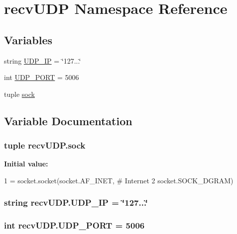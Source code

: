 \hypertarget{namespacerecvUDP}{}\section{recv\+U\+D\+P Namespace Reference}
\label{namespacerecvUDP}
\subsection*{Variables}
\begin{DoxyCompactItemize}
\item 
string \hyperlink{namespacerecvUDP_a8caab7f3ca6ec1e8af1bb857f11aeb48}{U\+D\+P\+\_\+\+I\+P} = \char`\"{}127...\char`\"{}
\item 
int \hyperlink{namespacerecvUDP_ae81aefcf2264fa54e865146f5eb6c0f3}{U\+D\+P\+\_\+\+P\+O\+R\+T} = 5006
\item 
tuple \hyperlink{namespacerecvUDP_aebe004867e01e6cc169425bf7c5cf54e}{sock}
\end{DoxyCompactItemize}


\subsection{Variable Documentation}
\hypertarget{namespacerecvUDP_aebe004867e01e6cc169425bf7c5cf54e}{}
\subsubsection[{sock}]{\setlength{\rightskip}{0pt plus 5cm}tuple recv\+U\+D\+P.\+sock}\label{namespacerecvUDP_aebe004867e01e6cc169425bf7c5cf54e}
{\bfseries Initial value\+:}
\begin{DoxyCode}
1 = socket.socket(socket.AF\_INET, \textcolor{comment}{# Internet}
2                      socket.SOCK\_DGRAM)
\end{DoxyCode}
\hypertarget{namespacerecvUDP_a8caab7f3ca6ec1e8af1bb857f11aeb48}{}
\subsubsection[{U\+D\+P\+\_\+\+I\+P}]{\setlength{\rightskip}{0pt plus 5cm}string recv\+U\+D\+P.\+U\+D\+P\+\_\+\+I\+P = \char`\"{}127...\char`\"{}}\label{namespacerecvUDP_a8caab7f3ca6ec1e8af1bb857f11aeb48}
\hypertarget{namespacerecvUDP_ae81aefcf2264fa54e865146f5eb6c0f3}{}
\subsubsection[{U\+D\+P\+\_\+\+P\+O\+R\+T}]{\setlength{\rightskip}{0pt plus 5cm}int recv\+U\+D\+P.\+U\+D\+P\+\_\+\+P\+O\+R\+T = 5006}\label{namespacerecvUDP_ae81aefcf2264fa54e865146f5eb6c0f3}
